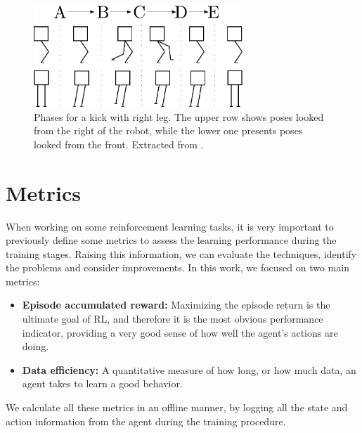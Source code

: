 \begin{figure}[H]
    \centering
    \includegraphics[width=0.7\textwidth]{Chapter5/kicking_phases.pdf} 
    \caption{Phases for a kick with right leg. The upper row shows poses looked from the right of the robot, while the lower one presents poses looked from the front. Extracted from \cite{MestradoManga}.}
    \label{fig:kicking_phases}
\end{figure}


\section{Metrics}
\label{sec:metrics}

When working on some reinforcement learning tasks, it is very important to previously define some metrics to assess the learning performance during the training stages. Raising this information, we can evaluate the techniques, identify the problems and consider improvements. In this work, we focused on two main metrics:

\begin{itemize}
\item \textbf{Episode accumulated reward:} Maximizing the episode return is the ultimate goal of RL, and therefore it is the most obvious performance indicator, providing a very good sense of how well the agent's actions are doing.

\item \textbf{Data efficiency:} A quantitative measure of how long, or how much data, an agent takes to learn a good behavior.
\end{itemize}

We calculate all these metrics in an offline manner, by logging all the state and action information from the agent during the training procedure.


